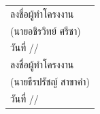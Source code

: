 \documentclass[20pt,a4paper]{article}
\newcommand{\firstStudentPrefixTH}{นาย}
\newcommand{\firstStudentNameTH}{อชิรวิทย์ ศรีชา}
\newcommand{\secondStudentPrefixTH}{นาย}
\newcommand{\secondStudentNameTH}{ธีรปรัชญ์ สาขาคำ}
\begin{document}

\renewcommand{\refname}{บรรณานุกรม (References)}




\begin{flushright}

\begin{tabular}{>{\centering\arraybackslash}p{}}

\vspace{0.5em}

ลงชื่อผู้ทำโครงงาน \dotfill
\\
(\firstStudentPrefixTH\firstStudentNameTH)
\\
วันที่ \dotfill/\dotfill/\dotfill
\\[1em]

ลงชื่อผู้ทำโครงงาน \dotfill
\\
(\secondStudentPrefixTH\secondStudentNameTH)
\\
วันที่ \dotfill/\dotfill/\dotfill

\end{tabular}

\end{flushright}
\end{document}

